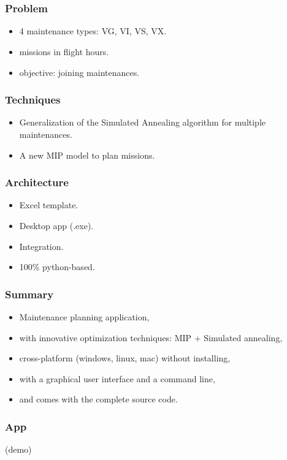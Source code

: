 \section[Dassault]{\dassault}

\begin{frame}
\frametitle{\textbf{Problem}}

  \begin{itemize}[<+->]
    \item 4 maintenance types: VG, VI, VS, VX.
    \item missions in flight hours.
    \item objective: joining maintenances.
  \end{itemize}
\end{frame}

\begin{frame}
\frametitle{\textbf{Techniques}}

  \begin{itemize}[<+->]
    \item Generalization of the Simulated Annealing algorithm for multiple maintenances.
    \item A new MIP model to plan missions.
  \end{itemize}
  

\end{frame}

\begin{frame}
\frametitle{\textbf{Architecture}}

  \begin{itemize}[<+->]
    \item Excel template.
    \item Desktop app (.exe).
    \item Integration.
    \item 100\% python-based.
  \end{itemize}

  \begin{adjustbox}{max totalsize={.7\textwidth}{.7\textheight},center}
    
  \end{adjustbox}


\end{frame}

\begin{frame}
\frametitle{\textbf{Summary}}

  \begin{itemize}[<+->]
    \item Maintenance planning application,
    \item with innovative optimization techniques: MIP + Simulated annealing,
    \item cross-platform (windows, linux, mac) without installing,
    \item with a graphical user interface and a command line,
    \item and comes with the complete source code.
  \end{itemize}

\end{frame}


\begin{frame}
\frametitle{\textbf{App}}

  (demo)

\end{frame}
